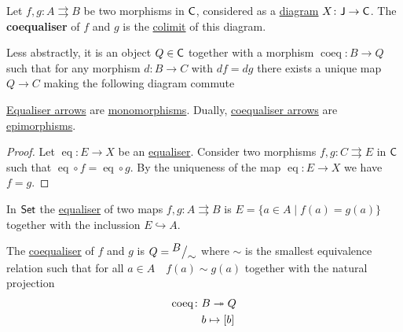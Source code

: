 \documentclass[../../main]{subfiles}
\begin{document}
\begin{definition}[Coequaliser]\label{def:coequaliser}
  Let \(f, g\colon A \rightrightarrows B\) be two morphisms in \(\mathsf{C}\), considered as a \hyperref[def:diagram]{diagram} \(X\colon \mathsf{J} \to \mathsf{C}\).
  The \textbf{coequaliser} of \(f\) and \(g\) is the \hyperref[def:categorical-colimit]{colimit} of this diagram.

  Less abstractly, it is an object \(Q \in \mathsf{C}\) together with a morphism \(\operatorname{coeq}\colon B \to Q\) such that for any morphism \(d\colon B \to C\) with \(df = dg\) there exists a unique map \(Q \to C\) making the following diagram commute
  \begin{center}
  \end{center}
\end{definition}

\begin{proposition}\label{prop:equaliser-coequaliser-mono-epi}
  \hyperref[def:equaliser]{Equaliser arrows} are \hyperref[def:mono-epi-morphism]{monomorphisms}.
  Dually, \hyperref[def:coequaliser]{coequaliser arrows} are \hyperref[def:mono-epi-morphism]{epimorphisms}.
\end{proposition}
\begin{proof}
  Let \(\operatorname{eq}\colon E \to X\) be an \hyperref[def:equaliser]{equaliser}.
  Consider two morphisms \(f, g\colon C \rightrightarrows E\) in \(\mathsf{C}\) such that \(\operatorname{eq} \circ f = \operatorname{eq} \circ g\).
  By the uniqueness of the map \(\operatorname{eq}\colon E \to X\) we have \(f = g\).
\end{proof}

\begin{example}\label{ex:equaliser-Set}
  In \(\mathsf{Set}\) the \hyperref[def:equaliser]{equaliser} of two maps \(f, g\colon A \rightrightarrows B\) is \(E = \{a \in A \mid f(a) = g(a)\}\) together with the inclussion \(E \hookrightarrow A\).

  The \hyperref[def:coequaliser]{coequaliser} of \(f\) and \(g\) is \(Q = {^{\textstyle B}\big/_{\textstyle \sim}}\) where \(\sim\) is the smallest equivalence relation such that for all \(a \in A \quad f(a) \sim g(a)\) together with the natural projection
  \begin{align*}
    \operatorname{coeq}\colon& B \twoheadrightarrow Q \\
                        & b \mapsto [b]
  \end{align*}
\end{example}
\end{document}
